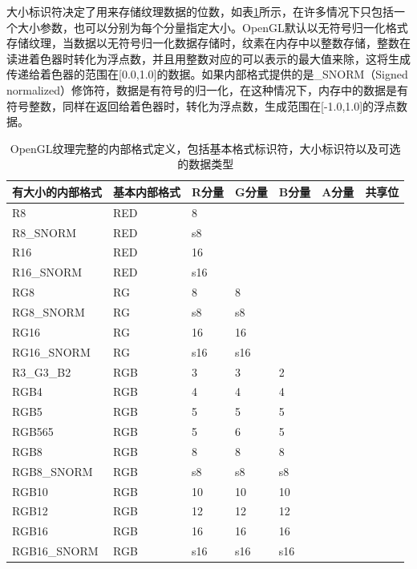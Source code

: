 大小标识符决定了用来存储纹理数据的位数，如表\ref{t:api-texture-sized-internal-format}所示，在许多情况下只包括一个大小参数，也可以分别为每个分量指定大小。OpenGL默认以无符号归一化格式存储纹理，当数据以无符号归一化数据存储时，纹素在内存中以整数存储，整数在读进着色器时转化为浮点数，并且用整数对应的可以表示的最大值来除，这将生成传递给着色器的范围在[0.0,1.0]的数据。如果内部格式提供的是\_SNORM（Signed normalized）修饰符，数据是有符号的归一化，在这种情况下，内存中的数据是有符号整数，同样在返回给着色器时，转化为浮点数，生成范围在[-1.0,1.0]的浮点数据。

\newpage
\begin{longtable}{>{\small}p{}|>{\small}p{}|>{\small}p{}|>{\small}p{}|>{\small}p{}|>{\small}p{}|>{\small}p{}}
\caption{OpenGL纹理完整的内部格式定义，包括基本格式标识符，大小标识符以及可选的数据类型}
\label{t:api-texture-sized-internal-format}\\

\hline 
   有大小的内部格式 & 基本内部格式 & R分量 & G分量 & B分量 &A分量 & 共享位 \\
    \hline  
  
  R8            & RED & 8   & &  & &\\ \hline
  R8\_SNORM     & RED & s8  & &  & &\\\hline
  R16           & RED & 16  & &  & &\\\hline
  R16\_SNORM    & RED & s16 & &  & &\\\hline
  RG8           & RG  & 8   & 8  & & &\\\hline
  RG8\_SNORM    & RG  & s8  & s8 & & &\\\hline
  RG16          & RG  & 16  & 16 & & &\\\hline
  RG16\_SNORM   & RG  & s16 & s16 & & &\\\hline
  
  R3\_G3\_B2   & RGB & 3 & 3 & 2 & &\\\hline
  RGB4          & RGB & 4 & 4 & 4 & &\\\hline
  RGB5          & RGB & 5 & 5 & 5 & &\\\hline
  RGB565        & RGB & 5 & 6 & 5 & &\\\hline
  RGB8          & RGB & 8 & 8 & 8 & &\\\hline
  RGB8\_SNORM   & RGB & s8 & s8 & s8 & &\\\hline
  RGB10         & RGB & 10 & 10 & 10 & &\\\hline
  RGB12         & RGB & 12 & 12 & 12 & &\\\hline
  RGB16         & RGB & 16 & 16 & 16 & &\\\hline
  RGB16\_SNORM  & RGB & s16 & s16 & s16 & &\\\hline
  

\end{longtable}
